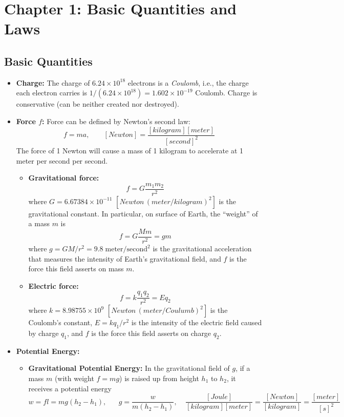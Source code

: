 \usepackage{html}


\section*{Chapter 1: Basic Quantities and Laws}

\subsection*{Basic Quantities}

\begin{itemize}

\item {\bf Charge:} The charge of $6.24 \times 10^{18}$ electrons is a 
  {\em Coulomb}, i.e., the charge each electron carries is 
  $1/ (6.24 \times 10^{18})=1.602 \times 10^{-19}$ Coulomb. Charge is 
  conservative (can be neither created nor destroyed).

\item {\bf Force $f$:} Force can be defined by Newton's second law: 
  \[ 
  f=ma,\;\;\;\;\;\;\;[Newton]=\frac{[kilogram][meter]}{[second]^2}	
  \]
  The force of 1 Newton will cause a mass of 1 kilogram to accelerate
  at 1 meter per second per second. 

  \begin{itemize}
  \item {\bf Gravitational force:}
    \[	
    f=G\frac{m_1m_2}{r^2}	
    \]
    where $G=6.67384\times 10^{-11}$ $[Newton\,(meter/kilogram)^2]$ is
    the gravitational constant.
    In particular, on surface of Earth, the ``weight'' of a mass $m$ is
    \[	
    f=G\frac{Mm}{r^2}=gm	
    \]
    where $g=GM/r^2=9.8\;\mbox{meter}/\mbox{second}^2$ is the gravitational 
    acceleration that measures the intensity of Earth's gravitational field,
    and $f$ is the force this field asserts on mass $m$.
  \item{\bf Electric force:}
    \[	
    f=k\frac{q_1q_2}{r^2}=Eq_2	
    \]
    where $k=8.98755\times 10^9$ $[Newton\,(meter/Coulumb)^2]$ is the
    Coulomb's constant, $E=kq_1/r^2$ is the intensity of the electric 
    field caused by charge $q_1$, and $f$ is the force this field asserts
    on charge $q_2$.
  \end{itemize}

\item {\bf Potential Energy:} 

  \begin{itemize}
  \item {\bf Gravitational Potential Energy:} In the gravitational field 
    of $g$, if a mass $m$ (with weight $f=mg$) is raised up from height 
    $h_1$ to $h_2$, it receives a potential energy
    \[
    w=fl=mg(h_2-h_1),\;\;\;\;\;\;g=\frac{w}{m(h_2-h_1)},\;\;\;\;
    \frac{[Joule]}{[kilogram][meter]}=\frac{[Newton]}{[kilogram]}
    =\frac{[meter]}{[s]^2}
    \]


\end{itemize}
\end{itemize}
